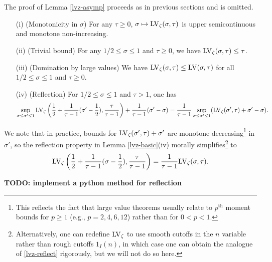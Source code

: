 The proof of Lemma \ref{lvz-asymp} proceeds as in previous sections and is omitted.

\begin{lemma}\label{lvz-basic}
    \begin{itemize}
        \item[(i)] (Monotonicity in $\sigma$) For any $\tau \geq 0$, $\sigma \mapsto \mathrm{LV}_\zeta(\sigma,\tau)$ is upper semicontinuous and monotone non-increasing.
        \item[(ii)] (Trivial bound) For any $1/2 \leq \sigma \leq 1$ and $\tau \geq 0$, we have $\mathrm{LV}_\zeta(\sigma,\tau) \leq \tau$.
        \item[(iii)] (Domination by large values)  We have $\mathrm{LV}_\zeta(\sigma,\tau) \leq \mathrm{LV}(\sigma,\tau)$ for all $1/2 \leq \sigma \leq 1$ and $\tau \geq 0$.
        \item[(iv)] (Reflection) For $1/2 \leq \sigma \leq 1$ and $\tau > 1$, one has
        $$ \sup_{\sigma \leq \sigma' \leq 1} \mathrm{LV}_\zeta\left(\frac{1}{2} + \frac{1}{\tau-1} (\sigma'-\frac{1}{2}), \frac{\tau}{\tau-1}\right) + \frac{1}{\tau-1} (\sigma'-\sigma) = \frac{1}{\tau-1} \sup_{\sigma \leq \sigma' \leq 1} (\mathrm{LV}_\zeta(\sigma',\tau) + \sigma'-\sigma).$$
    \end{itemize}
\end{lemma}


We note that in practice, bounds for $\mathrm{LV}_\zeta(\sigma',\tau)+\sigma'$ are monotone decreasing\footnote{This reflects the fact that large value theorems usually relate to $p^{\mathrm{th}}$ moment bounds for $p \geq 1$ (e.g., $p = 2, 4, 6, 12$) rather than for $0 < p < 1$.} in $\sigma'$, so the reflection property in Lemma \ref{lvz-basic}(iv) morally simplifies\footnote{Alternatively, one can redefine $\mathrm{LV}_\zeta$ to use smooth cutoffs in the $n$ variable rather than rough cutoffs $1_I(n)$, in which case one can obtain the analogue of \eqref{lvz-reflect} rigorously, but we will not do so here.} to
\begin{equation}\label{lvz-reflect}
     \mathrm{LV}_\zeta\left(\frac{1}{2} + \frac{1}{\tau-1} (\sigma-\frac{1}{2}), \frac{\tau}{\tau-1}\right) = \frac{1}{\tau-1} \mathrm{LV}_\zeta(\sigma,\tau).
\end{equation}

{\bf TODO: implement a python method for reflection}


